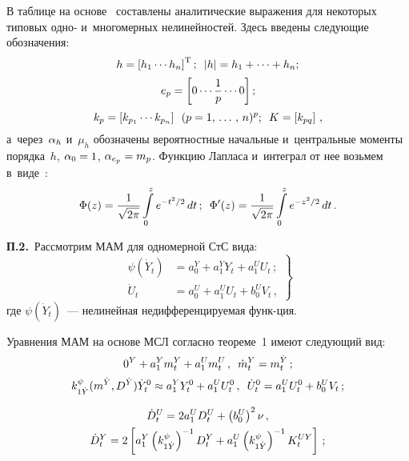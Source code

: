 \begin{multicols}{2}
{В таблице на основе~\cite{4-sin} составлены аналитические выражения для некоторых 
типовых одно- и~многомерных нелинейностей. Здесь введены следующие обозначения:
 $$
 h = \left[ h_1 \cdots h_n\right]^{\mathrm{T}};\enskip  | h| = h_1 +\cdots + h_n;$$
 $$
e_p = \left[ 0\cdots \displaystyle\frac{\displaystyle 1\mathstrut}{\displaystyle p\mathstrut}\cdots 0\right];
$$ 
 $$
 k_p = \lk k_{p_1} \cdots k_{p_n}\rk\enskip (p\hm= 1\tr n)^p;\enskip 
K=\lk k_{pq}\rk\,,
$$ 
а~через~$\alpha_h$ и~$\mu_h$ обозначены вероятностные 
 начальные и~центральные моменты порядка~$h$, $\alp_0 \hm=1$, $\alp_{e_p}\hm= m_p$. 
 Функцию Лапласа и~интеграл от нее возьмем в~виде~\cite{1-sin, 2-sin, 4-sin}:
    $$\Phi(z) = \displaystyle\frac{\displaystyle 1\mathstrut}{\displaystyle \sqrt{2\pi}\mathstrut} \int\limits_0^z e^{-t^2/2}\, dt\,;\enskip 
    \Phi'(z) = \displaystyle\frac{\displaystyle 1\mathstrut}{\displaystyle \sqrt{2\pi}\mathstrut} \int\limits_0^z e^{-z^2/2}\, dt\,.
    $$



\smallskip

\noindent
\textbf{П.2.}\ Рассмотрим МАМ для одномерной СтС вида:
    \begin{equation}
    \left.
    \begin{array}{rl}
    \psi \left(\dot Y_t\right) &= a_0^Y + a_1^Y Y_t + a_1^U U_t\,;\\[6pt] 
    \dot U_t &= a_0^U + a_1^U U_t + b_0^U V_t\,,
    \end{array}
    \right\}
    \label{p1}
    \end{equation}
где $\psi (\dot Y_t)$~--- нелинейная недифференцируемая функ-\linebreak ция.

Уравнения МАМ на основе МСЛ согласно теореме~1 имеют следующий вид:
    \begin{equation*}
    0^Y + a_1^Y m_t^Y + a_1^U m_t^U\,,\enskip 
    \dot m_t^Y = m_t^{\dot Y}\,; %
    \end{equation*}
    \begin{equation*}
    k_{1\dot Y}^\psi (m^{\dot Y}, D^{\dot Y}) \dot Y_t^0 \approx  
    a_1^Y Y_t^0 + a_1^U U_t^0\,,\enskip 
    \dot U_t^0 = a_1^U U_t^0 + b_0^U V_t\,; %
    \end{equation*}
    
    \vspace*{-12pt}
    
    \noindent
    \begin{multline*}
     \dot D_t^U = 2a_1^U D_t^U + \left(b_0^U\right)^2\nu\,, \\ 
     \dot D_t^Y=2\left[   a_1^Y\left(k_{1\dot Y}^\psi\right)^{-1} D_t^Y + 
     a_1^U \left(k_{1\dot Y}^\psi\right)^{-1} K_t^{UY}\right]\,;
     \end{multline*}
     
}
\end{multicols}

